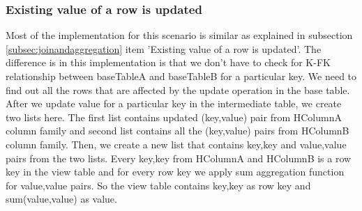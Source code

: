 \documentclass[11pt,a4paper,bibtotoc,idxtotoc,headsepline,footsepline,footexclude,BCOR12mm,DIV13]{scrbook}
\begin{document}
\subsubsection{Existing value of a row is updated}


Most of the implementation for this scenario is similar as explained in subsection \ref{subsec:joinandaggregation} item 'Existing value of a row is updated'. The difference is in this implementation is that we don't have to check for K-FK relationship between baseTableA and baseTableB for a particular key. We need to find out all the rows that are affected by the update operation in the base table. After we update value for a particular key in the intermediate table, we create two lists here. The first list contains updated (key,value) pair from HColumnA column family and second list contains all the (key,value) pairs from HColumnB column family. Then, we create a new list that contains key,key and value,value pairs from the two lists. Every key,key from HColumnA and HColumnB is a row key in the view table and for every row key we apply sum aggregation function for value,value pairs. So the view table contains key,key as row key and sum(value,value) as value.

\end{document}
